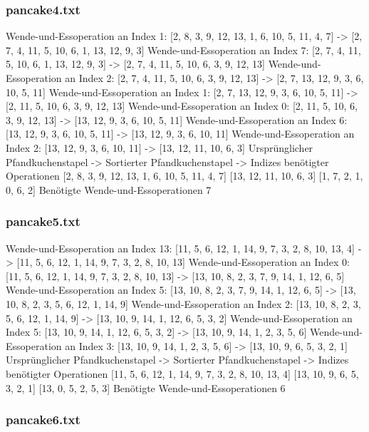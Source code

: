 {    \subsubsection{pancake4.txt}

    Wende-und-Essoperation an Index 1: [2, 8, 3, 9, 12, 13, 1, 6, 10, 5, 11, 4, 7] -> [2, 7, 4, 11, 5, 10, 6, 1, 13, 12, 9, 3]
    Wende-und-Essoperation an Index 7: [2, 7, 4, 11, 5, 10, 6, 1, 13, 12, 9, 3] -> [2, 7, 4, 11, 5, 10, 6, 3, 9, 12, 13]
    Wende-und-Essoperation an Index 2: [2, 7, 4, 11, 5, 10, 6, 3, 9, 12, 13] -> [2, 7, 13, 12, 9, 3, 6, 10, 5, 11]
    Wende-und-Essoperation an Index 1: [2, 7, 13, 12, 9, 3, 6, 10, 5, 11] -> [2, 11, 5, 10, 6, 3, 9, 12, 13]
    Wende-und-Essoperation an Index 0: [2, 11, 5, 10, 6, 3, 9, 12, 13] -> [13, 12, 9, 3, 6, 10, 5, 11]
    Wende-und-Essoperation an Index 6: [13, 12, 9, 3, 6, 10, 5, 11] -> [13, 12, 9, 3, 6, 10, 11]
    Wende-und-Essoperation an Index 2: [13, 12, 9, 3, 6, 10, 11] -> [13, 12, 11, 10, 6, 3]
    Ursprünglicher Pfandkuchenstapel -> Sortierter Pfandkuchenstapel -> Indizes benötigter Operationen
    [2, 8, 3, 9, 12, 13, 1, 6, 10, 5, 11, 4, 7]
    [13, 12, 11, 10, 6, 3]
    [1, 7, 2, 1, 0, 6, 2]
    Benötigte Wende-und-Essoperationen 7
    \subsubsection{pancake5.txt}

    Wende-und-Essoperation an Index 13: [11, 5, 6, 12, 1, 14, 9, 7, 3, 2, 8, 10, 13, 4] -> [11, 5, 6, 12, 1, 14, 9, 7, 3, 2, 8, 10, 13]
    Wende-und-Essoperation an Index 0: [11, 5, 6, 12, 1, 14, 9, 7, 3, 2, 8, 10, 13] -> [13, 10, 8, 2, 3, 7, 9, 14, 1, 12, 6, 5]
    Wende-und-Essoperation an Index 5: [13, 10, 8, 2, 3, 7, 9, 14, 1, 12, 6, 5] -> [13, 10, 8, 2, 3, 5, 6, 12, 1, 14, 9]
    Wende-und-Essoperation an Index 2: [13, 10, 8, 2, 3, 5, 6, 12, 1, 14, 9] -> [13, 10, 9, 14, 1, 12, 6, 5, 3, 2]
    Wende-und-Essoperation an Index 5: [13, 10, 9, 14, 1, 12, 6, 5, 3, 2] -> [13, 10, 9, 14, 1, 2, 3, 5, 6]
    Wende-und-Essoperation an Index 3: [13, 10, 9, 14, 1, 2, 3, 5, 6] -> [13, 10, 9, 6, 5, 3, 2, 1]
    Ursprünglicher Pfandkuchenstapel -> Sortierter Pfandkuchenstapel -> Indizes benötigter Operationen
    [11, 5, 6, 12, 1, 14, 9, 7, 3, 2, 8, 10, 13, 4]
    [13, 10, 9, 6, 5, 3, 2, 1]
    [13, 0, 5, 2, 5, 3]
    Benötigte Wende-und-Essoperationen 6
    \subsubsection{pancake6.txt}

}
